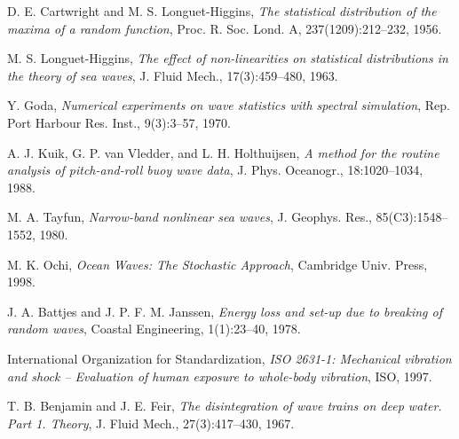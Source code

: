 \documentclass[11pt]{article}
\begin{document}
\begin{thebibliography}{9}
D. E. Cartwright and M. S. Longuet-Higgins,
\textit{The statistical distribution of the maxima of a random function},
Proc. R. Soc. Lond. A, 237(1209):212–232, 1956.

M. S. Longuet-Higgins,
\textit{The effect of non-linearities on statistical distributions in the theory of sea waves},
J. Fluid Mech., 17(3):459–480, 1963.

Y. Goda,
\textit{Numerical experiments on wave statistics with spectral simulation},
Rep. Port Harbour Res. Inst., 9(3):3–57, 1970.

A. J. Kuik, G. P. van Vledder, and L. H. Holthuijsen,
\textit{A method for the routine analysis of pitch-and-roll buoy wave data},
J. Phys. Oceanogr., 18:1020–1034, 1988.

M. A. Tayfun,
\textit{Narrow-band nonlinear sea waves},
J. Geophys. Res., 85(C3):1548–1552, 1980.

M. K. Ochi,
\textit{Ocean Waves: The Stochastic Approach},
Cambridge Univ. Press, 1998.

J. A. Battjes and J. P. F. M. Janssen,
\textit{Energy loss and set-up due to breaking of random waves},
Coastal Engineering, 1(1):23--40, 1978.

International Organization for Standardization,
\textit{ISO 2631-1: Mechanical vibration and shock -- Evaluation of human exposure to whole-body vibration},
ISO, 1997.

T. B. Benjamin and J. E. Feir,
\textit{The disintegration of wave trains on deep water. Part 1. Theory},
J. Fluid Mech., 27(3):417--430, 1967.
\end{thebibliography}
\end{document}
